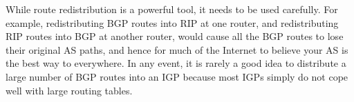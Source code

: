 While route redistribution is a powerful tool, it needs to be used
carefully.  For example, redistributing BGP routes into RIP at one
router, and redistributing RIP routes into BGP at another router,
would cause all the BGP routes to lose their original AS paths, and
hence for much of the Internet to believe your AS is the best way to
everywhere.  In any event, it is rarely a good idea to distribute a
large number of BGP routes into an IGP because most IGPs simply do not
cope well with large routing tables.
